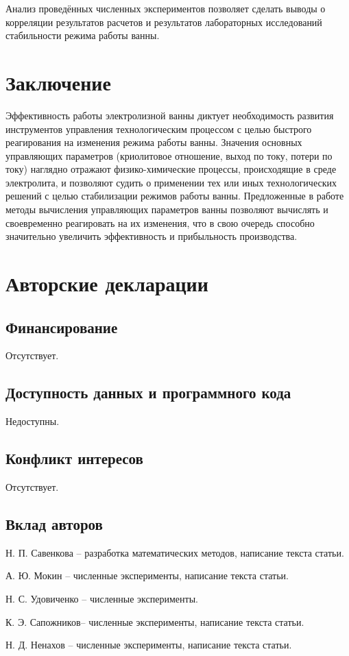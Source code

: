 \documentclass[pdflatex,sn-mathphys-gost]{pmi-jnl}
\begin{document}
Анализ проведённых численных экспериментов позволяет сделать выводы о корреляции результатов расчетов и результатов лабораторных исследований стабильности режима работы ванны.

\section{Заключение}

Эффективность работы электролизной ванны диктует необходимость развития инструментов управления технологическим процессом с целью быстрого реагирования на изменения режима работы ванны. Значения основных управляющих параметров (криолитовое отношение, выход по току, потери по току) наглядно отражают физико-химические процессы, происходящие в среде электролита, и позволяют судить о применении тех или иных технологических решений с целью стабилизации режимов работы ванны. Предложенные в работе методы вычисления управляющих параметров ванны позволяют вычислять и своевременно реагировать на их изменения, что в свою очередь способно значительно увеличить эффективность и прибыльность производства.

\section*{Авторские декларации}

\subsection*{Финансирование}

Отсутствует.

\subsection*{Доступность данных и программного кода}

Недоступны.

\subsection*{Конфликт интересов}

Отсутствует.

\subsection*{Вклад авторов}

Н. П. Савенкова -- разработка математических методов, написание текста статьи.

А. Ю. Мокин -- численные эксперименты, написание текста статьи.

Н. С. Удовиченко -- численные эксперименты.

К. Э. Сапожников-- численные эксперименты, написание текста статьи.

Н. Д. Ненахов -- численные эксперименты, написание текста статьи.

\end{document}
